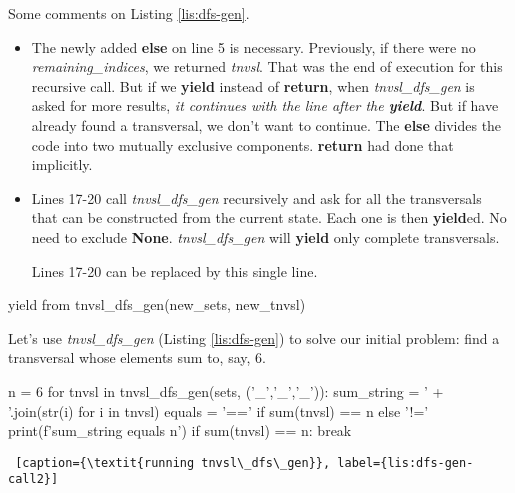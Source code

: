 Some comments on Listing \ref{lis:dfs-gen}.  %
\begin{itemize}
    \item The newly added \textbf{else} on line 5 is necessary. Previously, if there were no \textit{remaining\_indices}, we returned \textit{tnvsl}. That was the end of execution for this recursive call. But if we \textbf{yield} instead of \textbf{return}, when \textit{tnvsl\_dfs\_gen} is asked for more results, \textit{it continues with the line after the \textbf{yield}}. But if have already found a transversal, we don't want to continue. The \textbf{else} divides the code into two mutually exclusive components. \textbf{return} had done that implicitly.
    
    \item Lines 17-20 call \textit{tnvsl\_dfs\_gen} recursively and ask for all the transversals that can be constructed from the current state. Each one is then \textbf{yield}ed. No need to exclude \textbf{None}. \textit{tnvsl\_dfs\_gen} will \textbf{yield} only complete transversals. 
    
    \smallv
Lines 17-20 can be replaced by this single line.
\end{itemize}
\begin{center}
\begin{minipage}[c]{0.45\textwidth}
\begin{python1}
    yield from tnvsl_dfs_gen(new_sets, new_tnvsl)
\end{python1}
\end{minipage}   
\end{center}

Let's use \textit{tnvsl\_dfs\_gen} (Listing \ref{lis:dfs-gen}) to solve our initial problem: find a transversal whose elements sum to, say, 6.

\begin{center}
\begin{minipage}[c]{0.45\textwidth}
\begin{python1}
n = 6
for tnvsl in tnvsl_dfs_gen(sets, ('_','_','_')):
  sum_string = ' + '.join(str(i) for i in tnvsl)
  equals = '==' if sum(tnvsl) == n else '!='
  print(f'{sum_string} {equals} {n}')
  if sum(tnvsl) == n: break
\end{python1}\linv
\begin{lstlisting} [caption={\textit{running tnvsl\_dfs\_gen}}, label={lis:dfs-gen-call2}]
\end{lstlisting}
\end{minipage}
\end{center}


